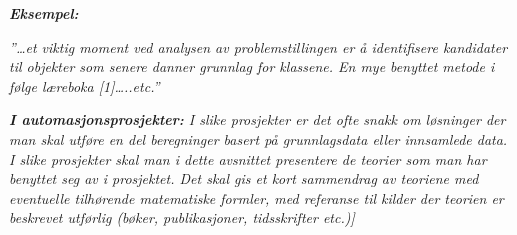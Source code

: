 \documentclass[../main.tex]{subfiles}
\begin{document}
{\bfseries\itshape\color{blue}
Eksempel:}

{\itshape\color{blue}
{}''{\dots}et viktig moment ved analysen av problemstillingen er {\aa} identifisere kandidater til objekter som senere
danner grunnlag for klassene. En mye benyttet metode i f{\o}lge l{\ae}reboka [1]{\dots}..etc.''}


\bigskip

{\itshape\color{blue}
\textbf{I automasjonsprosjekter:} I slike prosjekter er det ofte snakk om l{\o}sninger der man skal utf{\o}re en del
beregninger basert p{\aa} grunnlagsdata eller innsamlede data. I slike prosjekter skal man i dette avsnittet presentere
de teorier som man har benyttet seg av i prosjektet. Det skal gis et kort sammendrag av teoriene med eventuelle
tilh{\o}rende matematiske formler, med referanse til kilder der teorien er beskrevet utf{\o}rlig (b{\o}ker,
publikasjoner, tidsskrifter etc.)]}


\bigskip
\end{document}
